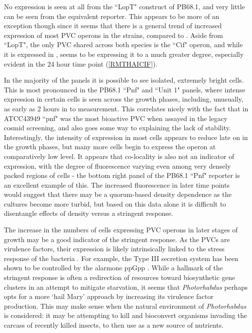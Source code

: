No expression is seen at all from the ``LopT" construct of PB68.1, and very little can be seen from the equivalent \Plum{} reporter. This appears to be more of an exception though since it seems that there is a general trend of increased expression of most PVC operons in the \Pasy{} strains, compared to \Plum. Aside from ``LopT", the only PVC shared across both species is the ``Cif" operon, and while it is expressed in \Plum, \Pasy{} seems to be expressing it to a much greater degree, especially evident in the 24 hour time point (\vref{RMTHAICIF}).

In the majority of the panels it is possible to see isolated, extremely bright cells. This is most pronounced in the \Pasy{} PB68.1 ``Pnf" and ``Unit 1" panels, where intense expression in certain cells is seen across the growth phases, including, unusually, as early as 2 hours in to measurement. This correlates nicely with the fact that in \Pasy{} ATCC43949 ``pnf" was the most bioactive PVC when assayed in the legacy cosmid screening, and also goes some way to explaining the lack of stability. Interestingly, the intensity of expression in most cells appears to reduce late on in the growth phases, but many more cells begin to express the operon at comparatively low level. It appears that co-locality is also not an indicator of expression, with the degree of fluorescence varying even among very densely packed regions of cells - the bottom right panel of the PB68.1 ``Pnf" reporter is an excellent example of this. The increased fluorescence in later time points would suggest that there may be a quorum-based density dependence as the cultures become more turbid, but based on this data alone it is difficult to disentangle effects of density versus a stringent response.

The increase in the numbers of cells expressing PVC operons in later stages of growth may be a good indicator of the stringent response. As the PVCs are virulence factors, their expression is likely intrinsically linked to the stress response of the bacteria \citep{Dalebroux2010, Chatnaparat2015 }. For example, the Type III secretion system has been shown to be controlled by the alarmone ppGpp \citep{Ancona2015}. While a hallmark of the stringent response is often a redirection of resources toward biosynthetic gene clusters in an attempt to mitigate starvation, it seems that \emph{Photorhabdus} perhaps opts for a more `hail Mary' approach by increasing its virulence factor production. This may make sense when the natural environment of \emph{Photorhabdus} is considered: it may be attempting to kill and bioconvert organisms invading the carcass of recently killed insects, to then use as a new source of nutrients.


